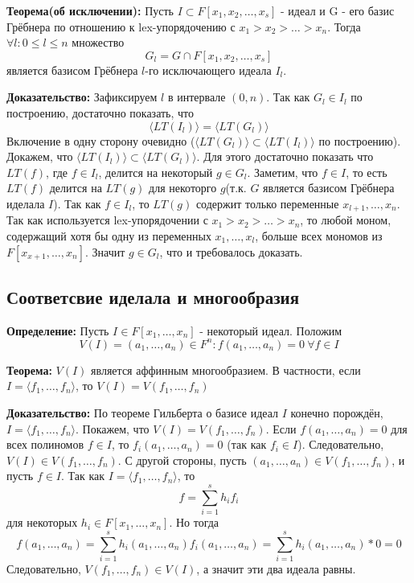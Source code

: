 \documentclass{article}
\begin{document}
    \textbf{Теорема(об исключении):} Пусть $I \subset F[x_1, x_2,\ldots, x_s]$ - идеал и G - его базис Грёбнера по отношению
    к lex-упорядочению с $x_1 > x_2 > \ldots > x_n$. Тогда $\forall l : 0 \leq l \leq n $ множество
    $$G_l = G \cap F[x_1, x_2,\ldots,x_s]$$ является базисом Грёбнера $l$-го исключающего идеала $I_l$.
    
    \textbf{Доказательство:} 
     Зафиксируем $l$ в интервале $(0, n)$. Так как $G_l \in I_l$ по построению, достаточно показать, что 
     $$\langle LT(I_l) \rangle =\langle LT(G_l) \rangle $$ 
     Включение в одну сторону очевидно
     ($\langle LT(G_l) \rangle \subset \langle LT(I_l) \rangle $ по построению). Докажем, что $\langle LT(I_l) \rangle \subset \langle LT(G_l) \rangle $.
     Для этого достаточно показать что $LT(f)$, где $f \in I_l$, делится на некоторый $g \in G_l$. 
     Заметим, что $f \in I$, то есть $LT(f)$ делится на $LT(g)$ для некоторго $g$(т.к. $G$ является базисом Грёбнера иделала $I$). 
     Так как $f \in I_l$, то $LT(g)$ содержит только переменные $x_{l+1}, \ldots, x_n$. Так как используется lex-упорядочении с 
     $x_1 > x_2 > \ldots > x_n$, то любой моном, содержащий хотя бы одну из переменных $x_1, \ldots, x_l$, больше всех мономов из
     $F[x_{x+1},\ldots, x_n]$. Значит $g\in G_l$, что и требовалось доказать.
    \newpage

    \subsection{Соответсвие иделала и многообразия}

    \textbf{Определение:} Пусть $I \in F[x_1,\ldots, x_n]$ - некоторый идеал. Положим
    $$V(I) = {(a_1, \ldots, a_n) \in F^n : f(a_1, \ldots, a_n) = 0 \:\forall f \in I}$$

    \textbf{Теорема:} $V(I)$ является аффинным многообразием. В частности, если $I = \langle f_1, \ldots, f_n \rangle $, то $V(I) = V(f_1,\ldots,f_n)$

    \textbf{Доказательство:} По теореме Гильберта о базисе идеал $I$ конечно порождён, $I = \langle f_1, \ldots, f_n \rangle $. Покажем, что $V(I) = V(f_1,\ldots,f_n)$.
    Если $f(a_1,\ldots,a_n) = 0$ для всех полиномов $f \in I$, то $f_i(a_1,\ldots,a_n)=0$ (так как $f_i \in I$). Следовательно,
    $V(I) \in V(f_1,\ldots,f_n)$. С другой стороны, пусть $(a_1,\ldots,a_n) \in V(f_1,\ldots, f_n)$, и пусть $f\in I$.
    Так как $I = \langle f_1,\ldots, f_n \rangle $, то $$f = \sum_{i=1}^s h_if_i$$ для некоторых $h_i \in F[x_1, \ldots, x_n]$.
    Но тогда 
    $$f(a_1,\ldots,a_n)=\sum_{i=1}^s h_i(a_1,\ldots,a_n)f_i(a_1,\ldots,a_n)=\sum_{i=1}^s h_i(a_1,\ldots,a_n)*0 = 0$$
    Следовательно, $V(f_1, \ldots, f_n) \in V(I)$, а значит эти два идеала равны. 
\end{document}

